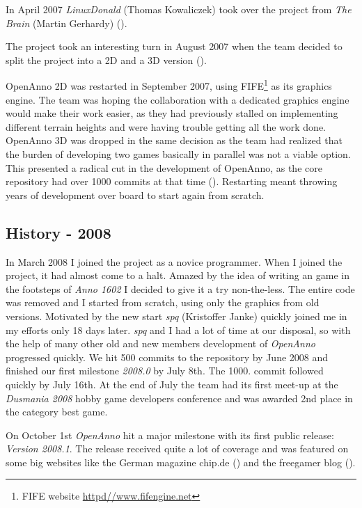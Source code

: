 In April 2007 \textit{LinuxDonald} (Thomas Kowaliczek) took over the project from
\textit{The Brain} (Martin Gerhardy) (\cite{ld1}).

The project took an interesting turn in August 2007 when the team decided to
split the project into a 2D and a 3D version (\cite{ld2}).

OpenAnno 2D was restarted in September 2007, using FIFE\footnote{FIFE
website \url{httpd//www.fifengine.net}} as its graphics engine. The team was hoping the collaboration with a dedicated
graphics engine would make their work easier, as they had previously stalled on implementing different terrain heights
and were having trouble getting all the work done. OpenAnno 3D was dropped in the same decision as the team had
realized that the burden of developing two games basically in parallel was not a viable option. This presented a radical
cut in the development of OpenAnno, as the core repository had over 1000 commits at that time (\cite{ld3}). Restarting meant throwing years of development over board
to start again from scratch.

\subsection{History - 2008}
In March 2008 I joined the project as a novice programmer. When I joined the project, it had almost come to a halt. Amazed
by the idea of writing an \OS{} game in the footsteps of \textit{Anno 1602} I decided to give it a try non-the-less. The
entire code was removed and I started from scratch, using only the graphics from old versions. Motivated by the new start
\textit{spq} (Kristoffer Janke) quickly joined me in my efforts only 18 days later. \textit{spq} and I had a lot of time at our disposal, so with
the help of many other old and new members development of \textit{OpenAnno} progressed quickly. We hit 500 commits to the repository
by June 2008 and finished our first milestone \textit{2008.0} by July 8th. The 1000. commit followed quickly by July 16th. At the
end of July the team had its first meet-up at the \textit{Dusmania 2008} hobby game developers conference and was awarded
2nd place in the category best game.

On October 1st \textit{OpenAnno} hit a major milestone with its first public release: \textit{Version 2008.1}. The release
received quite a lot of coverage and was featured on some big websites like the German magazine chip.de (\cite{chipde08})
and the freegamer blog (\cite{freegamer}).

